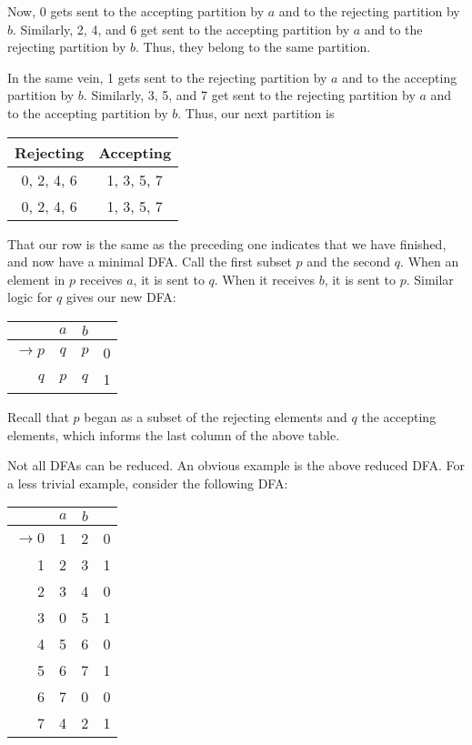 Now, 0 gets sent to the accepting partition by \(a\) and to the rejecting partition by \(b\). Similarly, 2, 4, and 6 get sent to the accepting partition by \(a\) and to the rejecting partition by \(b\). Thus, they belong to the same partition.

In the same vein, 1 gets sent to the rejecting partition by \(a\) and to the accepting partition by \(b\). Similarly, 3, 5, and 7 get sent to the rejecting partition by \(a\) and to the accepting partition by \(b\). Thus, our next partition is

\begin{center}\begin{tabular}{c c c c c c c c}
\multicolumn{4}{|c|}{Rejecting} & \multicolumn{4}{|c|}{Accepting}\\\bottomrule
\multicolumn{4}{|c|}{0, 2, 4, 6} & \multicolumn{4}{|c|}{1, 3, 5, 7}\\
\multicolumn{4}{|c|}{0, 2, 4, 6} & \multicolumn{4}{|c|}{1, 3, 5, 7}
\end{tabular}\end{center}

That our row is the same as the preceding one indicates that we have finished, and now have a minimal DFA\@. Call the first subset \(p\) and the second \(q\). When an element in \(p\) receives \(a\), it is sent to \(q\). When it receives \(b\), it is sent to \(p\). Similar logic for \(q\) gives our new DFA\@:

\begin{center}\begin{tabular}{r c c r}
         & \(a\) & \(b\) & \\\bottomrule
         \(\to p\) & \(q\) & \(p\) & 0\\
               \(q\) & \(p\) & \(q\) & 1\\
    \end{tabular}\end{center}

Recall that \(p\) began as a subset of the rejecting elements and \(q\) the accepting elements, which informs the last column of the above table.
    
Not all DFAs can be reduced. An obvious example is the above reduced DFA\@. For a less trivial example, consider the following DFA\@:
   
    \begin{center}\begin{tabular}{r c c r}
         & \(a\) & \(b\) & \\\bottomrule
         \(\to 0\) & 1 & 2 & 0\\
               1 & 2 & 3 & 1\\
               2 & 3 & 4 & 0\\
               3 & 0 & 5 & 1\\
               4 & 5 & 6 & 0\\
               5 & 6 & 7 & 1\\
               6 & 7 & 0 & 0\\
               7 & 4 & 2 & 1
    \end{tabular}\end{center}

